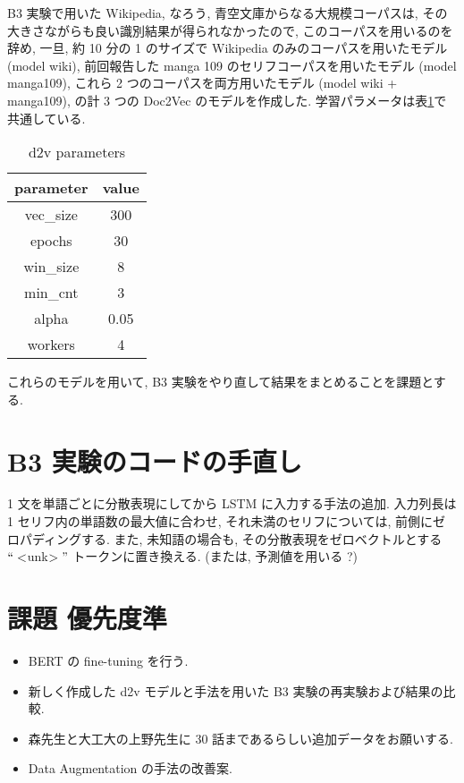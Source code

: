 \documentclass[twocolumn]{jarticle}     %
\begin{document}
B3 実験で用いた Wikipedia, なろう, 青空文庫からなる大規模コーパスは, その大きさながらも良い識別結果が得られなかったので, このコーパスを用いるのを辞め,
一旦, 約 10 分の 1 のサイズで Wikipedia のみのコーパスを用いたモデル (model wiki),
前回報告した manga 109 のセリフコーパスを用いたモデル (model manga109),
これら 2 つのコーパスを両方用いたモデル (model wiki + manga109),
の計 3 つの Doc2Vec のモデルを作成した. 学習パラメータは表\ref{tab:d2v}で共通している.

\begin{table}[htb]
\begin{center}
\caption{d2v parameters}
\begin{tabular}{|c|c|}
\hline
parameter & value \\ \hline
vec\_size & 300   \\
epochs    & 30    \\
win\_size & 8     \\
min\_cnt  & 3     \\
alpha     & 0.05  \\
workers   & 4     \\ \hline
\end{tabular}
\label{tab:d2v}
\end{center}
\end{table}

これらのモデルを用いて, B3 実験をやり直して結果をまとめることを課題とする.

\section{B3 実験のコードの手直し}
1 文を単語ごとに分散表現にしてから LSTM に入力する手法の追加. 入力列長は 1 セリフ内の単語数の最大値に合わせ,
それ未満のセリフについては, 前側にゼロパディングする. また, 未知語の場合も, その分散表現をゼロベクトルとする $``<$unk$>"$ トークンに置き換える. (または, 予測値を用いる ?)

\section{課題 優先度準}
\begin{itemize}
  \item BERT の fine-tuning を行う.
  \item 新しく作成した d2v モデルと手法を用いた B3 実験の再実験および結果の比較.
  \item 森先生と大工大の上野先生に 30 話まであるらしい追加データをお願いする.
  \item Data Augmentation の手法の改善案.
\end{itemize}






\end{document}
